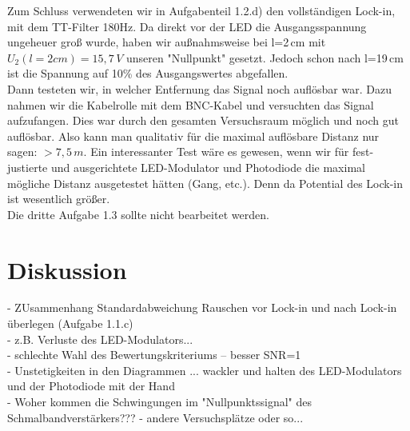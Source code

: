 \documentclass{scrartcl}						%
\begin{document}
\begin{figure}[h!t!]
			\end{figure}
			Zum Schluss verwendeten wir in Aufgabenteil 1.2.d) den vollständigen Lock-in, mit dem TT-Filter 180Hz. Da direkt vor der LED die Ausgangsspannung ungeheuer groß wurde, haben wir außnahmsweise bei l=2\,cm mit $ U_2(l=2cm)=15,7\,V $ unseren "Nullpunkt" gesetzt. Jedoch schon nach l=19\,cm ist die Spannung auf 10\% des Ausgangswertes abgefallen. \\
			Dann testeten wir, in welcher Entfernung das Signal noch auflösbar war. Dazu nahmen wir die Kabelrolle mit dem BNC-Kabel und versuchten das Signal aufzufangen. Dies war durch den gesamten Versuchsraum möglich und noch gut auflösbar. Also kann man qualitativ für die maximal auflösbare Distanz nur sagen: $ >7,5\,m $. Ein interessanter Test wäre es gewesen, wenn wir für fest-justierte und ausgerichtete LED-Modulator und Photodiode die maximal mögliche Distanz ausgetestet hätten (Gang, etc.). Denn da Potential des Lock-in ist wesentlich größer.\newline
			\\
			Die dritte Aufgabe 1.3 sollte nicht bearbeitet werden.
			
	\clearpage

\section{Diskussion}
- ZUsammenhang Standardabweichung Rauschen vor Lock-in und nach Lock-in überlegen (Aufgabe 1.1.c) \\
				- z.B. Verluste des LED-Modulators...\\
				- schlechte Wahl des Bewertungskriteriums -- besser SNR=1\\
				- Unstetigkeiten in den Diagrammen ... wackler und halten des LED-Modulators und der Photodiode mit der Hand\\
				- Woher kommen die Schwingungen im "Nullpunktssignal" des Schmalbandverstärkers??? - andere Versuchsplätze oder so...
				
\end{document}

